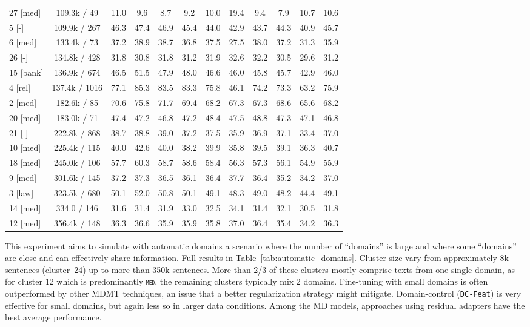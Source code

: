\documentclass[12pt,a4paper,twoside]{report}
\theoremstyle{definition}
\newcommand{\domain}[1]{\texttt{\textsc{#1}}}
\newcommand{\system}[1]{\texttt{{#1}}}
\begin{document}
\begin{table*}[t]
\begin{tabular}{|p{1.3cm}|*{11}{c|}}
27 \hfill [med]&109.3k / 49&11.0&9.6&8.7&9.2&10.0&19.4&9.4&7.9&10.7&10.6 \\
5 \hfill [-]&109.9k / 267&46.3&47.4&46.9&45.4&44.0&42.9&43.7&44.3&40.9&45.7 \\
6 \hfill [med]&133.4k / 73&37.2&38.9&38.7&36.8&37.5&27.5&38.0&37.2&31.3&35.9 \\
26 \hfill [-]&134.8k / 428&31.8&30.8&31.8&31.2&31.9&32.6&32.2&30.5&29.6&31.2 \\
15 \hfill [bank]&136.9k / 674&46.5&51.5&47.9&48.0&46.6&46.0&45.8&45.7&42.9&46.0 \\
4 \hfill [rel]&137.4k / 1016&77.1&85.3&83.5&83.3&75.8&46.1&74.2&73.3&63.2&75.9 \\
2 \hfill [med]&182.6k / 85&70.6&75.8&71.7&69.4&68.2&67.3&67.3&68.6&65.6&68.2 \\
20 \hfill [med]&183.0k / 71&47.4&47.2&46.8&47.2&48.4&47.5&48.8&47.3&47.1&46.8 \\
21 \hfill [-]&222.8k / 868&38.7&38.8&39.0&37.2&37.5&35.9&36.9&37.1&33.4&37.0 \\
10 \hfill [med]&225.4k / 115&40.0&42.6&40.0&38.2&39.9&35.8&39.5&39.1&36.3&40.7 \\
18 \hfill [med]&245.0k / 106&57.7&60.3&58.7&58.6&58.4&56.3&57.3&56.1&54.9&55.9 \\
9 \hfill [med]&301.6k / 145&37.2&37.3&36.5&36.1&36.4&37.7&36.4&35.2&34.2&37.0 \\
3 \hfill [law]&323.5k / 680&50.1&52.0&50.8&50.1&49.1&48.3&49.0&48.2&44.4&49.1 \\
14 \hfill [med]&334.0 / 146&31.6&31.4&31.9&33.0&32.5&34.1&31.4&32.1&30.5&31.8 \\
12 \hfill [med]&356.4k / 148&36.3&36.6&35.9&35.9&35.8&37.0&36.4&35.4&34.2&36.3 \\ \hline
  \end{tabular}
  \caption{Complete results for the experiments with automatic domains. For each cluster, we report: the majority domain when one domain accounts for more than 75\% of the class; training and test sizes; and BLEU scores obtained with the various systems used in this study. Most test sets are too small to report significance tests.}
  \label{tab:automatic_domains}
\end{table*}

This experiment aims to simulate with automatic domains a scenario where the number of ``domains'' is large and where some ``domains'' are close and can effectively share information. Full results in Table~\ref{tab:automatic_domains}. Cluster size vary from approximately 8k sentences (cluster~24) up to more than 350k sentences. More than 2/3 of these clusters mostly comprise texts from one single domain, as for cluster 12 which is predominantly \domain{med}, the remaining clusters typically mix 2 domains. Fine-tuning with small domains is often outperformed by other MDMT techniques, an issue that a better regularization strategy might mitigate. Domain-control (\system{DC-Feat}) is very effective for small domains, but again less so in larger data conditions. Among the MD models, approaches using residual adapters have the best average performance.
\end{document}
